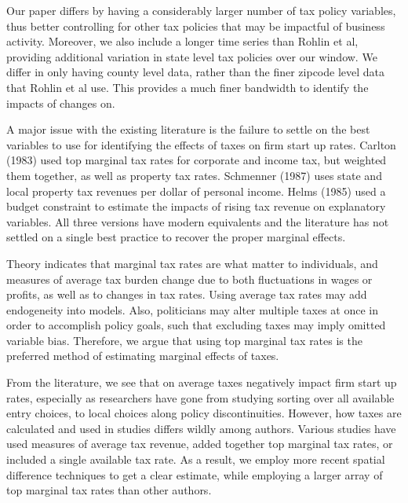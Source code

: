 Our paper differs by having a considerably larger number of tax policy variables, thus better controlling for other tax policies that may be impactful of business activity. Moreover, we also include a longer time series than Rohlin et al, providing additional variation in state level tax policies over our window. We differ in only having county level data, rather than the finer zipcode level data that Rohlin et al use. This provides a much finer bandwidth to identify the impacts of changes on.

A major issue with the existing literature is the failure to settle on the best variables to use for identifying the effects of taxes on firm start up rates. Carlton (1983) used top marginal tax rates for corporate and income tax, but weighted them together, as well as property tax rates. Schmenner (1987) uses state and local property tax revenues per dollar of personal income. Helms (1985) used a budget constraint to estimate the impacts of rising tax revenue on explanatory variables. All three versions have modern equivalents and the literature has not settled on a single best practice to recover the proper marginal effects.

Theory indicates that marginal tax rates are what matter to individuals, and measures of average tax burden change due to both fluctuations in wages or profits, as well as to changes in tax rates. Using average tax rates may add endogeneity into models. Also, politicians may alter multiple taxes at once in order to accomplish policy goals, such that excluding taxes may imply omitted variable bias. Therefore, we argue that using top marginal tax rates is the preferred method of estimating marginal effects of taxes. 

From the literature, we see that on average taxes negatively impact firm start up rates, especially as researchers have gone from studying sorting over all available entry choices, to local choices along policy discontinuities. However, how taxes are calculated and used in studies differs wildly among authors. Various studies have used measures of average tax revenue, added together top marginal tax rates, or included a single available tax rate. As a result, we employ more recent spatial difference techniques to get a clear estimate, while employing a larger array of top marginal tax rates than other authors.